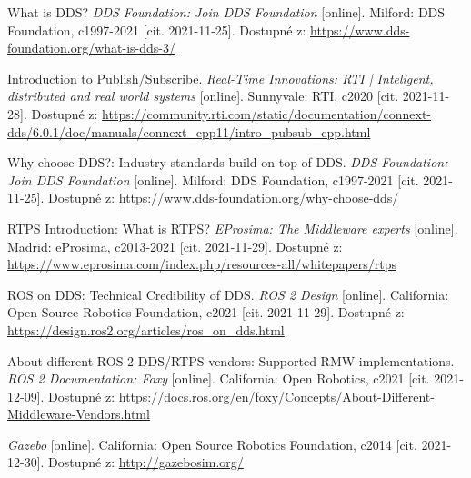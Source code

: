 \begin{thebibliography}{99}
What is DDS? \textit{DDS Foundation: Join DDS Foundation} [online]. Milford: DDS Foundation, c1997-2021 [cit. 2021-11-25]. Dostupné z: \href{https://www.dds-foundation.org/what-is-dds-3/}{https://www.dds-foundation.org/what-is-dds-3/}

Introduction to Publish/Subscribe. \textit{Real-Time Innovations: RTI | Inteligent, distributed and real world systems} [online]. Sunnyvale: RTI, c2020 [cit. 2021-11-28]. Dostupné z: \href{https://community.rti.com/static/documentation/connext-dds/6.0.1/doc/manuals/connext\_dds/getting\_started/cpp11/intro\_pubsub\_cpp.html}{https://community.rti.com/static/documentation/connext-dds/6.0.1/doc/manuals/connext\_cpp11/intro\_pubsub\_cpp.html}

Why choose DDS?: Industry standards build on top of DDS. \textit{DDS Foundation: Join DDS Foundation} [online]. Milford: DDS Foundation, c1997-2021 [cit. 2021-11-25]. Dostupné z: \href{https://www.dds-foundation.org/why-choose-dds/}{https://www.dds-foundation.org/why-choose-dds/}

RTPS Introduction: What is RTPS? \textit{EProsima: The Middleware experts} [online]. Madrid: eProsima, c2013-2021 [cit. 2021-11-29]. Dostupné z: \href{https://www.eprosima.com/index.php/resources-all/whitepapers/rtps}{https://www.eprosima.com/index.php/resources-all/whitepapers/rtps}

ROS on DDS: Technical Credibility of DDS. \textit{ROS 2 Design} [online]. California: Open Source Robotics Foundation, c2021 [cit. 2021-11-29]. Dostupné z: \href{https://design.ros2.org/articles/ros\_on\_dds.html}{https://design.ros2.org/articles/ros\_on\_dds.html}


About different ROS 2 DDS/RTPS vendors: Supported RMW implementations. \textit{ROS 2 Documentation: Foxy} [online]. California: Open Robotics, c2021 [cit. 2021-12-09]. Dostupné z: \href{https://docs.ros.org/en/foxy/Concepts/About-Different-Middleware-Vendors.html}{https://docs.ros.org/en/foxy/Concepts/About-Different-Middleware-Vendors.html}


\textit{Gazebo} [online]. California: Open Source Robotics Foundation, c2014 [cit. 2021-12-30]. Dostupné z: \href{http://gazebosim.org/}{http://gazebosim.org/}


\end{thebibliography}
